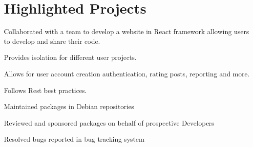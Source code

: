 \documentclass[letterpaper,10pt]{article}
\begin{document}

    \section{Highlighted Projects}

    \begin{resume_list}
        \item Collaborated with a team to develop a website in React framework allowing users to develop and share their code.
        \item Provides isolation for different user projects.
        \item Allows for user account creation authentication, rating posts, reporting and more.
        \item Follows Rest best practices. 
    \end{resume_list}

    \begin{resume_list}
        \item Maintained packages in Debian repositories
        \item Reviewed and sponsored packages on behalf of prospective Developers
        \item Resolved bugs reported in bug tracking system
    \end{resume_list}

    
\end{document}
